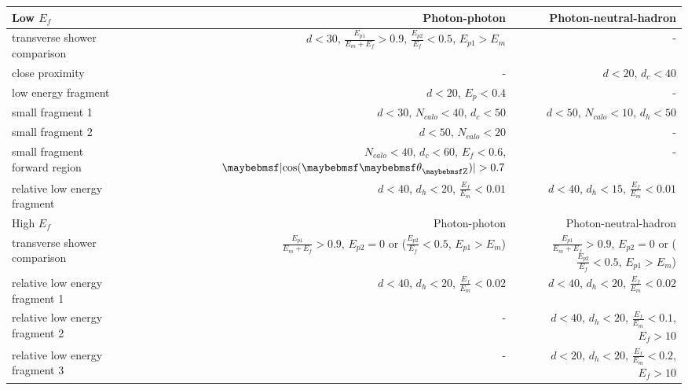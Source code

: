 \begin{table}[htbp]
\centering

\smallskip

\begin{tabular}{l  r  r }
\hline
Low $E_f$ &  Photon-photon & Photon-neutral-hadron \\
\hline
\multicolumn{1}{L{0.3\textwidth}}{transverse shower comparison} & \multicolumn{1}{R{0.3\textwidth}}{$d < 30 $, $\frac{E_{p1}}{E_m + E_f} > 0.9 $, $\frac{E_{p2}}{E_f} < 0.5 $, $E_{p1} > E_m$}  & \multicolumn{1}{R{0.3\textwidth}}{-} \\
\multicolumn{1}{L{0.3\textwidth}}{close proximity} & \multicolumn{1}{R{0.3\textwidth}}{-}  & \multicolumn{1}{R{0.3\textwidth}}{$d < 20 $, $d_c < 40 $} \\
\multicolumn{1}{L{0.3\textwidth}}{low energy fragment} & \multicolumn{1}{R{0.3\textwidth}}{$d < 20 $, $E_p < 0.4 $}  & \multicolumn{1}{R{0.3\textwidth}}{-} \\
\multicolumn{1}{L{0.3\textwidth}}{small fragment 1} & \multicolumn{1}{R{0.3\textwidth}}{$d < 30 $, $N_{calo} < 40 $, $d_c < 50 $}  & \multicolumn{1}{R{0.3\textwidth}}{$d < 50 $, $N_{calo} < 10 $, $d_h < 50$} \\
\multicolumn{1}{L{0.3\textwidth}}{small fragment 2} & \multicolumn{1}{R{0.3\textwidth}}{$d < 50 $, $N_{calo} < 20 $}  & \multicolumn{1}{R{0.3\textwidth}}{-} \\
\multicolumn{1}{L{0.3\textwidth}}{small fragment forward region} & \multicolumn{1}{R{0.3\textwidth}}{$N_{calo} < 40$, $d_c < 60$, $E_f < 0.6$, $\absCosTheta > 0.7$}  & \multicolumn{1}{R{0.3\textwidth}}{-} \\
\multicolumn{1}{L{0.3\textwidth}}{relative low energy fragment} & \multicolumn{1}{R{0.3\textwidth}}{$d < 40$, $d_h < 20$, $\frac{E_{f}}{E_m} < 0.01$}  & \multicolumn{1}{R{0.3\textwidth}}{$d < 40$, $d_h < 15$, $\frac{E_{f}}{E_m} < 0.01$} \\
\hline
High $E_f$ &  Photon-photon & Photon-neutral-hadron \\
\hline
\multicolumn{1}{L{0.3\textwidth}}{transverse shower comparison} & \multicolumn{1}{R{0.3\textwidth}}{$\frac{E_{p1}}{E_m + E_f} > 0.9 $, $E_{p2} = 0$ or ($\frac{E_{p2}}{E_f} < 0.5 $, $E_{p1} > E_m$)}  & \multicolumn{1}{R{0.3\textwidth}}{$\frac{E_{p1}}{E_m + E_f} > 0.9 $, $E_{p2} = 0$ or ($\frac{E_{p2}}{E_f} < 0.5 $, $E_{p1} > E_m$)} \\
\multicolumn{1}{L{0.3\textwidth}}{relative low energy fragment 1} & \multicolumn{1}{R{0.3\textwidth}}{$d < 40$, $d_h < 20$, $\frac{E_f}{E_m} < 0.02$} & \multicolumn{1}{R{0.3\textwidth}}{$d < 40$, $d_h < 20$, $\frac{E_f}{E_m} < 0.02$} \\
\multicolumn{1}{L{0.3\textwidth}}{relative low energy fragment 2} & \multicolumn{1}{R{0.3\textwidth}}{-}  & \multicolumn{1}{R{0.3\textwidth}}{$d < 40$, $d_h < 20$, $\frac{E_f}{E_m} < 0.1$, $E_f > 10$} \\
\multicolumn{1}{L{0.3\textwidth}}{relative low energy fragment 3} & \multicolumn{1}{R{0.3\textwidth}}{-}  & \multicolumn{1}{R{0.3\textwidth}}{$d < 20$, $d_h < 20$, $\frac{E_f}{E_m} < 0.2$, $E_f > 10$} \\
\hline


\end{tabular}
\end{table}
